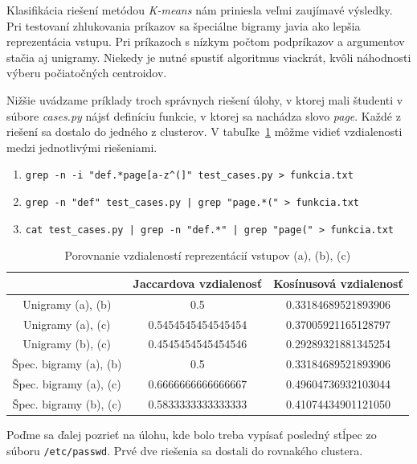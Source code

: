 Klasifikácia riešení metódou \textit{K-means} nám priniesla veľmi zaujímavé výsledky.
Pri testovaní zhlukovania príkazov sa špeciálne bigramy javia ako
lepšia reprezentácia vstupu. Pri príkazoch s nízkym počtom podpríkazov a argumentov
stačia aj unigramy. Niekedy je nutné spustiť algoritmus viackrát, kvôli náhodnosti
výberu počiatočných centroidov.

Nižšie uvádzame príklady troch správnych riešení úlohy, v ktorej mali študenti v súbore \textit{cases.py}
nájsť definíciu funkcie, v ktorej sa nachádza slovo \textit{page}. Každé z riešení sa
dostalo do jedného z clusterov. V tabuľke~\ref{tab:distances} môžme vidieť vzdialenosti
medzi jednotlivými riešeniami.
\begin{enumerate}[label=(\alph*)]
	\item \verb'grep -n -i "def.*page[a-z^(]" test_cases.py > funkcia.txt'
	\item \verb'grep -n "def" test_cases.py | grep "page.*(" > funkcia.txt'
	\item \verb'cat test_cases.py | grep -n "def.*" | grep "page(" > funkcia.txt'
\end{enumerate}

\begin{table}[h]
	\centering
	\begin{tabular}{|c||c|c|} 
		\hline
		& Jaccardova vzdialenosť
		& Kosínusová vzdialenosť\\
		\hline
		Unigramy (a), (b) & 0.5 & 0.33184689521893906\\
		\hline
		Unigramy (a), (c) & 0.5454545454545454 & 0.37005921165128797\\
		\hline
		Unigramy (b), (c) & 0.4545454545454546 & 0.29289321881345254\\
		\Xhline{1.5pt}
		Špec. bigramy (a), (b) & 0.5 & 0.33184689521893906\\
		\hline
		Špec. bigramy (a), (c) & 0.6666666666666667 & 0.49604736932103044\\
		\hline
		Špec. bigramy (b), (c) & 0.5833333333333333 & 0.41074434901121050\\
		\hline
	\end{tabular}
	\caption[Porovnanie vzdialeností reprezentácií vstupov (a), (b), (c)]{Porovnanie vzdialeností reprezentácií vstupov (a), (b), (c)}
	\label{tab:distances}
\end{table}

Poďme sa ďalej pozrieť na úlohu, kde bolo treba vypísať posledný stĺpec zo súboru
\verb'/etc/passwd'. Prvé dve riešenia sa dostali do rovnakého clustera.

